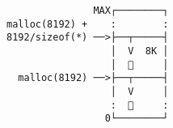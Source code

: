 \documentclass[varwidth,crop]{standalone}
\begin{document}
\begin{verbatim}
               MAX┌────────┐
malloc(8192) +    :        :
8192/sizeof(*) ──>├──┬─────┤
                  │  V  8K │
                  │       │
  malloc(8192) ──>├──┬─────┤
                  │  V     │
                  :       :
                 0└────────┘
\end{verbatim}
\end{document}
